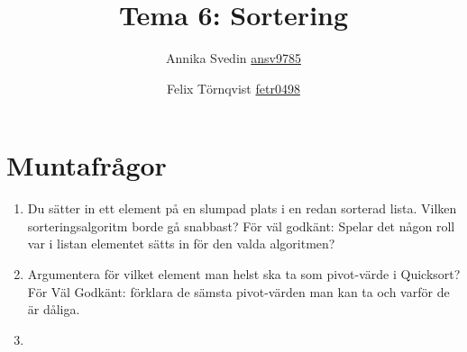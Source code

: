 \documentclass[a5paper,10pt,oneside]{article}
\title{Tema 6: Sortering}
\author{Annika Svedin \url{ansv9785} \and Felix Törnqvist \url{fetr0498}}
\begin{document}
\maketitle

\section*{Muntafrågor}

\begin{enumerate}

	\item Du sätter in ett element på en slumpad plats i en redan sorterad lista. Vilken sorteringsalgoritm borde gå snabbast?
		För väl godkänt: Spelar det någon roll var i listan elementet sätts in för den valda algoritmen?
	
	
	\item Argumentera för vilket element man helst ska ta som pivot-värde i Quicksort? För Väl Godkänt: förklara de sämsta pivot-värden man kan ta och varför de är dåliga.
	
	\item 
\end{enumerate}
\end{document}
